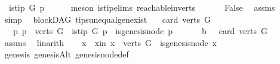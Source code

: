 \begin{isabellebody}
\ {\isachardoublequoteopen}{\isasymnot}\ is{\isacharunderscore}{\kern0pt}tip\ G\ p{\isachardoublequoteclose}\isanewline
\ \ \ \ \isamarkupfalse%
\ {\isacharparenleft}{\kern0pt}meson\ is{\isacharunderscore}{\kern0pt}tip{\isachardot}{\kern0pt}elims{\isacharparenleft}{\kern0pt}{}{\isacharparenright}{\kern0pt}\ reachable{}{\isacharunderscore}{\kern0pt}in{\isacharunderscore}{\kern0pt}verts{\isacharparenleft}{\kern0pt}{}{\isacharparenright}{\kern0pt}{\isacharparenright}{\kern0pt}\ \isanewline
\ \ \isamarkupfalse%
\ \isamarkupfalse%
\ False\ \isamarkupfalse%
\ assms\ \isamarkupfalse%
\ simp\isanewline
{}\isamarkupfalse%
%
\endisatagproof
{\isafoldproof}%
%
\isadelimproof
\isanewline
%
\endisadelimproof
\isanewline
\isanewline
\isanewline
{}\isamarkupfalse%
\ {\isacharparenleft}{\kern0pt}\ blockDAG{\isacharparenright}{\kern0pt}\ tips{\isacharunderscore}{\kern0pt}unequal{\isacharunderscore}{\kern0pt}gen{\isacharunderscore}{\kern0pt}exist{\isacharcolon}{\kern0pt}\isanewline
\ \ \ {\isachardoublequoteopen}card{\isacharparenleft}{\kern0pt}\ verts\ G{\isacharparenright}{\kern0pt}\ {\isachargreater}{\kern0pt}\ {}{\isachardoublequoteclose}\isanewline
\ \ \ {\isachardoublequoteopen}{\isasymexists}p{\isachardot}{\kern0pt}\ p\ {\isasymin}\ verts\ G\ {\isasymand}\ is{\isacharunderscore}{\kern0pt}tip\ G\ p\ {\isasymand}\ {\isasymnot}is{\isacharunderscore}{\kern0pt}genesis{\isacharunderscore}{\kern0pt}node\ p\ {\isachardoublequoteclose}\isanewline
%
\isadelimproof
%
\endisadelimproof
%
\isatagproof
{}\isamarkupfalse%
\ {\isacharminus}{\kern0pt}\isanewline
\ \ \isamarkupfalse%
\ b{}{\isacharcolon}{\kern0pt}\ {\isachardoublequoteopen}{}\ {\isacharless}{\kern0pt}\ card\ {\isacharparenleft}{\kern0pt}verts\ G{\isacharparenright}{\kern0pt}{\isachardoublequoteclose}\ \isamarkupfalse%
\ assms\ \isamarkupfalse%
\ linarith\isanewline
\ \ \isamarkupfalse%
\ x\ \ x{\isacharunderscore}{\kern0pt}in{\isacharcolon}{\kern0pt}\ {\isachardoublequoteopen}x\ {\isasymin}\ {\isacharparenleft}{\kern0pt}verts\ G{\isacharparenright}{\kern0pt}\ {\isasymand}\ is{\isacharunderscore}{\kern0pt}genesis{\isacharunderscore}{\kern0pt}node\ x{\isachardoublequoteclose}\ \isanewline
\ \ \ \ \isamarkupfalse%
\ genesis\ genesisAlt\ genesis{\isacharunderscore}{\kern0pt}node{\isacharunderscore}{\kern0pt}def\ \ \isamarkupfalse%

\end{isabellebody}
